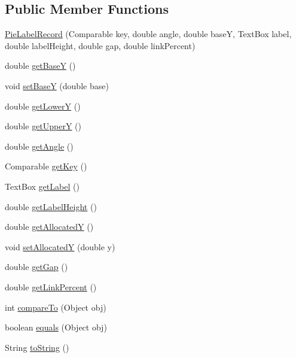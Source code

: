 \subsection*{Public Member Functions}
\begin{DoxyCompactItemize}
\item 
\mbox{\hyperlink{classorg_1_1jfree_1_1chart_1_1plot_1_1_pie_label_record_a758d6c0bb984c94debd8c622398a5808}{Pie\+Label\+Record}} (Comparable key, double angle, double baseY, Text\+Box label, double label\+Height, double gap, double link\+Percent)
\item 
double \mbox{\hyperlink{classorg_1_1jfree_1_1chart_1_1plot_1_1_pie_label_record_aa6901975f19d4be4a95f5f5dce047dcc}{get\+BaseY}} ()
\item 
void \mbox{\hyperlink{classorg_1_1jfree_1_1chart_1_1plot_1_1_pie_label_record_a2aee1d343705be7a32d01b5f3c6df7a9}{set\+BaseY}} (double base)
\item 
double \mbox{\hyperlink{classorg_1_1jfree_1_1chart_1_1plot_1_1_pie_label_record_a488268ee71a373424f99c2322128692e}{get\+LowerY}} ()
\item 
double \mbox{\hyperlink{classorg_1_1jfree_1_1chart_1_1plot_1_1_pie_label_record_a87e271cda1924eea7b014f44b4bebbf5}{get\+UpperY}} ()
\item 
double \mbox{\hyperlink{classorg_1_1jfree_1_1chart_1_1plot_1_1_pie_label_record_ae08e2461f0ad4404436fc3e7250894ab}{get\+Angle}} ()
\item 
Comparable \mbox{\hyperlink{classorg_1_1jfree_1_1chart_1_1plot_1_1_pie_label_record_a3b90471826659117df61cf9df5a64baf}{get\+Key}} ()
\item 
Text\+Box \mbox{\hyperlink{classorg_1_1jfree_1_1chart_1_1plot_1_1_pie_label_record_a9287b0c186570cc2736669744623aadd}{get\+Label}} ()
\item 
double \mbox{\hyperlink{classorg_1_1jfree_1_1chart_1_1plot_1_1_pie_label_record_a88b958aeeeccf35eaccc72980e0b1709}{get\+Label\+Height}} ()
\item 
double \mbox{\hyperlink{classorg_1_1jfree_1_1chart_1_1plot_1_1_pie_label_record_a0d4d2282bda9a56d3d0bb59947ab520a}{get\+AllocatedY}} ()
\item 
void \mbox{\hyperlink{classorg_1_1jfree_1_1chart_1_1plot_1_1_pie_label_record_a45f81b5a3f503da0954dd8f8990f1e56}{set\+AllocatedY}} (double y)
\item 
double \mbox{\hyperlink{classorg_1_1jfree_1_1chart_1_1plot_1_1_pie_label_record_ae04b37f671dd35fffb6172e19d7f4fe0}{get\+Gap}} ()
\item 
double \mbox{\hyperlink{classorg_1_1jfree_1_1chart_1_1plot_1_1_pie_label_record_acb7040ad84c8d197ef5b64ddfe4c0187}{get\+Link\+Percent}} ()
\item 
int \mbox{\hyperlink{classorg_1_1jfree_1_1chart_1_1plot_1_1_pie_label_record_a523d8bb7557e1d4b2153404f34dace35}{compare\+To}} (Object obj)
\item 
boolean \mbox{\hyperlink{classorg_1_1jfree_1_1chart_1_1plot_1_1_pie_label_record_a7691803cfa8d9d6b79806c3abb2d1e7c}{equals}} (Object obj)
\item 
String \mbox{\hyperlink{classorg_1_1jfree_1_1chart_1_1plot_1_1_pie_label_record_a38f9bb3c4a1d20119cfb9704e58d4781}{to\+String}} ()
\end{DoxyCompactItemize}


